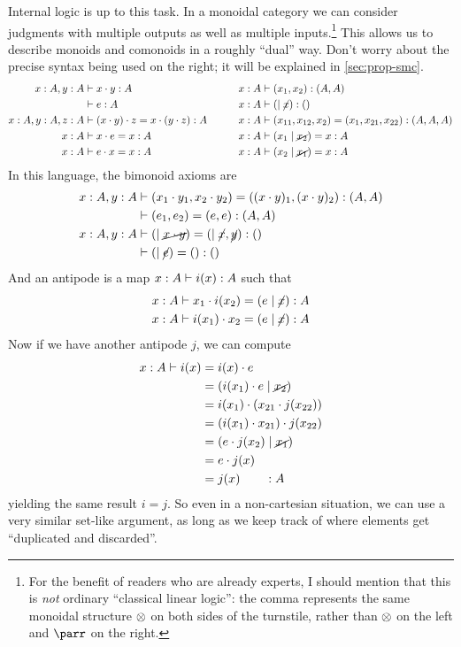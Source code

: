 \begin{props}
Internal logic is up to this task.
In a monoidal category we can consider judgments with multiple outputs as well as multiple inputs.\footnote{For the benefit of readers who are already experts, I should mention that this is \emph{not} ordinary ``classical linear logic'': the comma represents the same monoidal structure $\otimes$ on both sides of the turnstile, rather than $\otimes$ on the left and $\parr$ on the right.}
This allows us to describe monoids and comonoids in a roughly ``dual'' way.
Don't worry about the precise syntax being used on the right; it will be explained in \cref{sec:prop-smc}.
\begin{alignat*}{2}
  x:A, y:A &\vdash x\cdot y:A &\qquad x:A &\vdash (x_1,x_2):(A,A)\\
  &\vdash e:A &\qquad x:A &\vdash (\mid\cancel{x}):()\\
  x:A,y:A,z:A &\vdash (x\cdot y)\cdot z = x\cdot (y\cdot z) :A &\qquad x:A &\vdash (x_{11},x_{12},x_2)=(x_1,x_{21},x_{22}):(A,A,A)\\
  x:A &\vdash x\cdot e=x:A &\qquad x:A &\vdash (x_1\mid\cancel{x_2}) = x:A\\
  x:A &\vdash e\cdot x=x:A &\qquad x:A &\vdash (x_2\mid\cancel{x_1}) = x:A
\end{alignat*}
In this language, the bimonoid axioms are
\begin{align*}
  x:A,y:A &\vdash (x_1\cdot y_1,x_2\cdot y_2) = ((x\cdot y)_1,(x\cdot y)_2) :(A,A)\\
          &\vdash (e_1,e_2)=(e,e):(A,A)\\
  x:A,y:A &\vdash (\mid\cancel{x\cdot y}) = (\mid\cancel{x},\cancel{y}) : ()\\
  &\vdash (\mid\cancel{e})=():()
\end{align*}
And an antipode is a map $x:A \vdash i(x):A$ such that
\begin{align*}
  x:A &\vdash x_1\cdot i(x_2) = (e\mid\cancel{x}) :A\\
  x:A &\vdash i(x_1)\cdot x_2 = (e\mid\cancel{x}) :A
\end{align*}
Now if we have another antipode $j$, we can compute
\begin{align*}
  x:A \vdash i(x)
  &= i(x)\cdot e\\
  &= (i(x_1)\cdot e\mid\cancel{x_2})\\
  &= i(x_1)\cdot (x_{21} \cdot j(x_{22}))\\
  &= (i(x_1)\cdot x_{21}) \cdot j(x_{22})\\
  &= (e \cdot j(x_{2})\mid\cancel{x_1})\\
  &= e\cdot j(x)\\
  &= j(x) \qquad :A
\end{align*}
yielding the same result $i=j$.
So even in a non-cartesian situation, we can use a very similar set-like argument, as long as we keep track of where elements get ``duplicated and discarded''.
\end{props}

